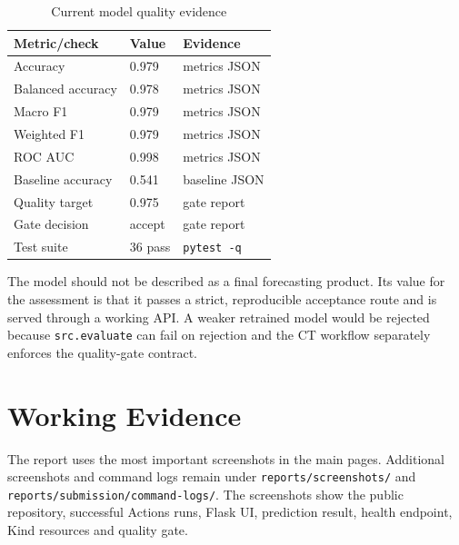 \documentclass[journal,twoside,web]{ieeecolor}
\begin{document}
\begin{table}[!t]
\caption{Current model quality evidence}
\label{tab:metrics}
\centering
\scriptsize
\renewcommand{\arraystretch}{1.12}
\begin{tabular}{|L{1.05in}|L{0.5in}|L{0.92in}|}
\hline
\textbf{Metric/check} & \textbf{Value} & \textbf{Evidence} \\
\hline
Accuracy & 0.979 & metrics JSON \\
\hline
Balanced accuracy & 0.978 & metrics JSON \\
\hline
Macro F1 & 0.979 & metrics JSON \\
\hline
Weighted F1 & 0.979 & metrics JSON \\
\hline
ROC AUC & 0.998 & metrics JSON \\
\hline
Baseline accuracy & 0.541 & baseline JSON \\
\hline
Quality target & 0.975 & gate report \\
\hline
Gate decision & accept & gate report \\
\hline
Test suite & 36 pass & \texttt{pytest -q} \\
\hline
\end{tabular}
\end{table}

The model should not be described as a final forecasting product. Its value for the assessment is that it passes a strict, reproducible acceptance route and is served through a working API. A weaker retrained model would be rejected because \texttt{src.evaluate} can fail on rejection and the CT workflow separately enforces the quality-gate contract.

\section{Working Evidence}
The report uses the most important screenshots in the main pages. Additional screenshots and command logs remain under \texttt{reports/screenshots/} and \texttt{reports/submission/command-logs/}. The screenshots show the public repository, successful Actions runs, Flask UI, prediction result, health endpoint, Kind resources and quality gate.
\end{document}
